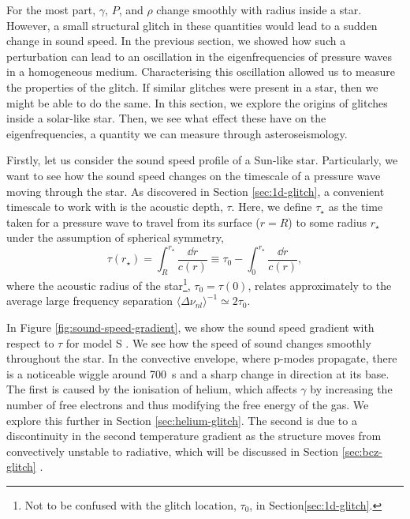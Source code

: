 For the most part, \(\gamma\), \(P\), and \(\rho\) change smoothly with radius inside a star. However, a small structural glitch in these quantities would lead to a sudden change in sound speed. In the previous section, we showed how such a perturbation can lead to an oscillation in the eigenfrequencies of pressure waves in a homogeneous medium. Characterising this oscillation allowed us to measure the properties of the glitch. If similar glitches were present in a star, then we might be able to do the same. In this section, we explore the origins of glitches inside a solar-like star. Then, we see what effect these have on the eigenfrequencies, a quantity we can measure through asteroseismology.

Firstly, let us consider the sound speed profile of a Sun-like star. Particularly, we want to see how the sound speed changes on the timescale of a pressure wave moving through the star. As discovered in Section \ref{sec:1d-glitch}, a convenient timescale to work with is the acoustic depth, \(\tau\). Here, we define \(\tau_\star\) as the time taken for a pressure wave to travel from its surface (\(r=R\)) to some radius \(r_\star\) under the assumption of spherical symmetry,
%
\begin{equation}
    \tau(r_\star) = \int_R^{r_\star} \frac{\dd r}{c(r)} \equiv \tau_0 - \int_0^{r_\star} \frac{\dd r}{c(r)},\label{eq:tau}
\end{equation}
%
where the acoustic radius of the star\footnote{Not to be confused with the glitch location, \(\tau_0\), in Section\ref{sec:1d-glitch}.}, \(\tau_0 = \tau(0)\), relates approximately to the average large frequency separation \(\langle\Delta\nu_{nl}\rangle^{-1} \simeq 2\tau_0\).

In Figure \ref{fig:sound-speed-gradient}, we show the sound speed gradient with respect to \(\tau\) for model S . We see how the speed of sound changes smoothly throughout the star. In the convective envelope, where p-modes propagate, there is a noticeable wiggle around \SI{700}{\second} and a sharp change in direction at its base. The first is caused by the ionisation of helium, which affects \(\gamma\) by increasing the number of free electrons and thus modifying the free energy of the gas. We explore this further in Section \ref{sec:helium-glitch}. The second is due to a discontinuity in the second temperature gradient as the structure moves from convectively unstable to radiative, which will be discussed in Section \ref{sec:bcz-glitch} .

